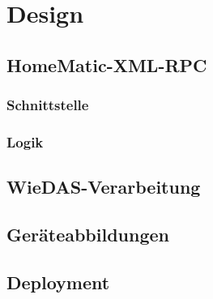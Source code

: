 \chapter{Design}

\section{HomeMatic-XML-RPC}

\subsection{Schnittstelle}

\subsection{Logik}

\section{WieDAS-Verarbeitung}

\section{Geräteabbildungen}

\section{Deployment}
